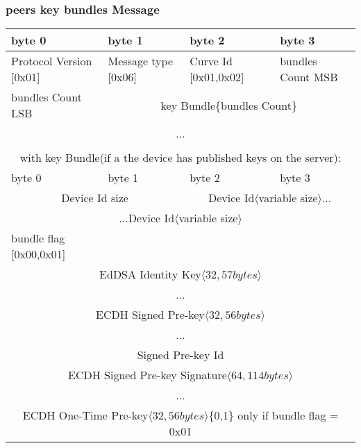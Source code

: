 \documentclass[a4paper,11pt]{article}
\begin{document}
    \subsubsection{peers key bundles Message}
      \begin{center}
      \begin{tabular}{ | p{1.4in} | p{1.4in} | p{1.4in} | p{1.4in} |}
        \hline
        \cellcolor[gray]{0.85} byte 0 & \cellcolor[gray]{0.85} byte 1 & \cellcolor[gray]{0.85} byte 2 & \cellcolor[gray]{0.85}byte 3\\
        \hline
        Protocol Version [0x01] & Message type [0x06] & Curve Id [0x01,0x02] & bundles Count MSB\\
        \hline
        bundles Count LSB & \multicolumn{3}{c|}{key Bundle\{bundles Count\}}\\
        \cline{1-1}
        \multicolumn{4}{|c|}{...}\\
        \hline
        \multicolumn{4}{c}{}\\
        \multicolumn{4}{c}{with key Bundle(if a the device has published keys on the server):}\\
        \hline
        \cellcolor[gray]{0.95} byte 0 & \cellcolor[gray]{0.95} byte 1 & \cellcolor[gray]{0.95} byte 2 & \cellcolor[gray]{0.95}byte 3\\
        \hline
        \multicolumn{2}{|c|}{Device Id size}&\multicolumn{2}{c|}{Device Id$\langle$variable size$\rangle$...}\\
        \hline
        \multicolumn{4}{|c|}{...Device Id$\langle$variable size$\rangle$}\\
        \hline
        bundle flag [0x00,0x01] & \multicolumn{3}{c|}{}\\
        \cline{1-1}
        \multicolumn{4}{|c|}{EdDSA Identity Key$\langle 32,57bytes\rangle $}\\
        \multicolumn{4}{|c|}{...}\\
        \hline
        \multicolumn{4}{|c|}{ECDH Signed Pre-key$\langle 32,56bytes\rangle $}\\
        \multicolumn{4}{|c|}{...}\\
        \hline
        \multicolumn{4}{|c|}{Signed Pre-key Id}\\
        \hline
        \multicolumn{4}{|c|}{ECDH Signed Pre-key Signature$\langle 64,114bytes\rangle $}\\
        \multicolumn{4}{|c|}{...}\\
        \hline
        \multicolumn{4}{|c|}{ECDH One-Time Pre-key$\langle 32,56bytes\rangle $\{0,1\} only if bundle flag = 0x01}\\

\end{tabular}
\end{center}
\end{document}
